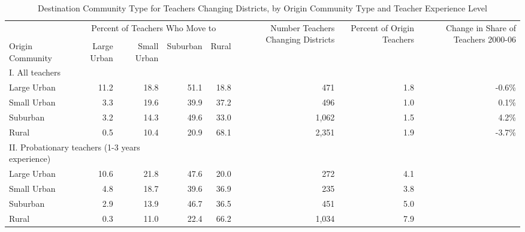 \documentclass[]{article}
\begin{document}
\begin{sidewaystable}[htbp]
\centering
\begin{tabular}{lrrrrrrr}
  \hline
 & \multicolumn{4}{c}{\multirow{2}{*}{Percent of Teachers Who Move to}} & \multirow{4}{*}{\parbox{0.09\linewidth}{Number Teachers Changing Districts}} & \multirow{4}{*}{\parbox{0.07\linewidth}{Percent of Origin Teachers}} & \multirow{4}{*}{\parbox{0.07\linewidth}{Change in Share of Teachers 2000-06}}\\
 & \multicolumn{4}{c}{} & & & \\ \cline{2-5}
& & & & & & & \\
Origin Community & Large Urban & Small Urban & Suburban & Rural &  &  &  \\ 
  \hline
I. All teachers & & & & & & & \\
\quad Large Urban & 11.2 & 18.8 & 51.1 & 18.8 & 471 & 1.8 & -0.6\% \\ 
  \quad Small Urban & 3.3 & 19.6 & 39.9 & 37.2 & 496 & 1.0 & 0.1\% \\ 
  \quad Suburban & 3.2 & 14.3 & 49.6 & 33.0 & 1,062 & 1.5 & 4.2\% \\ 
  \quad Rural & 0.5 & 10.4 & 20.9 & 68.1 & 2,351 & 1.9 & -3.7\% \\ 
\multicolumn{3}{l}{II. Probationary teachers (1-3 years experience)} & & & & & \\
  \quad Large Urban & 10.6 & 21.8 & 47.6 & 20.0 & 272 & 4.1 &  \\ 
  \quad Small Urban & 4.8 & 18.7 & 39.6 & 36.9 & 235 & 3.8 &  \\ 
  \quad Suburban & 2.9 & 13.9 & 46.7 & 36.5 & 451 & 5.0 &  \\ 
  \quad Rural & 0.3 & 11.0 & 22.4 & 66.2 & 1,034 & 7.9 &  \\ 
   \hline
\end{tabular}
\caption{Destination Community Type for Teachers Changing Districts, by Origin Community Type and Teacher Experience Level} 
\label{tbl:markov}
\end{sidewaystable}
\end{document}
